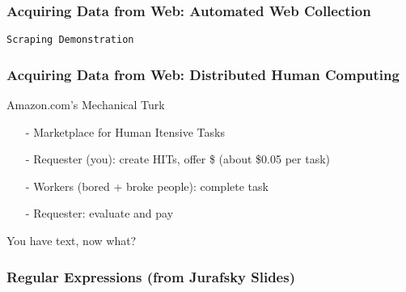 \documentclass{beamer}
\numberwithin{equation}{section}
\begin{document}
\begin{frame}
\frametitle{Acquiring Data from Web: Automated Web Collection}



\end{frame}

\begin{frame}

{\tt Scraping Demonstration}

\end{frame}




\begin{frame}
\frametitle{Acquiring Data from Web: Distributed Human Computing}
Amazon.com's \alert{Mechanical Turk}

\begin{itemize}
\item[-] Marketplace for \alert{H}uman \alert{I}tensive \alert{T}asks
\item[-] Requester (you): create HITs, offer \$ (about \$0.05 per task)
\item[-] Workers (bored + broke people): complete task
\item[-] Requester: evaluate and pay
\end{itemize}



\end{frame}



\begin{frame}

\huge
You have text, now what?


\end{frame}


\begin{frame}
\frametitle{Regular Expressions (from Jurafsky Slides) }

\begin{center}
\end{center}


\end{frame}
\end{document}

